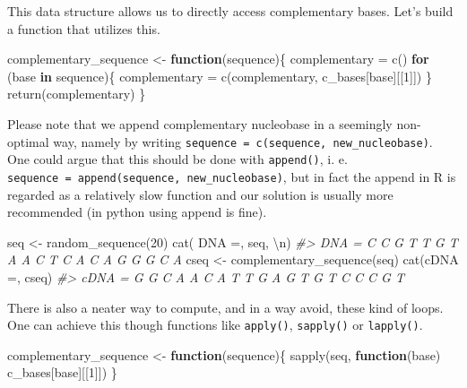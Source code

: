\documentclass[
]{book}
\newenvironment{Shaded}{\begin{snugshade}}{\end{snugshade}}
\newcommand{\CommentTok}[1]{\textcolor[rgb]{0.56,0.35,0.01}{\textit{#1}}}
\newcommand{\ControlFlowTok}[1]{\textcolor[rgb]{0.13,0.29,0.53}{\textbf{#1}}}
\newcommand{\DecValTok}[1]{\textcolor[rgb]{0.00,0.00,0.81}{#1}}
\newcommand{\FunctionTok}[1]{\textcolor[rgb]{0.00,0.00,0.00}{#1}}
\newcommand{\NormalTok}[1]{#1}
\newcommand{\OtherTok}[1]{\textcolor[rgb]{0.56,0.35,0.01}{#1}}
\newcommand{\SpecialCharTok}[1]{\textcolor[rgb]{0.00,0.00,0.00}{#1}}
\newcommand{\StringTok}[1]{\textcolor[rgb]{0.31,0.60,0.02}{#1}}
\begin{document}
This data structure allows us to directly access complementary bases. Let's build a function that utilizes this.

\begin{Shaded}
\begin{Highlighting}[]
\NormalTok{complementary\_sequence }\OtherTok{\textless{}{-}} \ControlFlowTok{function}\NormalTok{(sequence)\{}
\NormalTok{  complementary }\OtherTok{=} \FunctionTok{c}\NormalTok{()}
  \ControlFlowTok{for}\NormalTok{ (base }\ControlFlowTok{in}\NormalTok{ sequence)\{}
\NormalTok{    complementary }\OtherTok{=} \FunctionTok{c}\NormalTok{(complementary, c\_bases[base][[}\DecValTok{1}\NormalTok{]])}
\NormalTok{  \}}
  \FunctionTok{return}\NormalTok{(complementary)}
\NormalTok{\}}
\end{Highlighting}
\end{Shaded}

Please note that we append complementary nucleobase in a seemingly non-optimal way, namely by writing \texttt{sequence\ =\ c(sequence,\ new\_nucleobase)}. One could argue that this should be done with \texttt{append()}, i. e. \texttt{sequence\ =\ append(sequence,\ new\_nucleobase)}, but in fact the append in R is regarded as a relatively slow function and our solution is usually more recommended (in python using append is fine).

\begin{Shaded}
\begin{Highlighting}[]
\NormalTok{seq }\OtherTok{\textless{}{-}} \FunctionTok{random\_sequence}\NormalTok{(}\DecValTok{20}\NormalTok{)}
\FunctionTok{cat}\NormalTok{(}\StringTok{\textquotesingle{} DNA =\textquotesingle{}}\NormalTok{, seq, }\StringTok{\textquotesingle{}}\SpecialCharTok{\textbackslash{}n}\StringTok{\textquotesingle{}}\NormalTok{)}
\CommentTok{\#\textgreater{}  DNA = C C G T T G T A A C T C A C A G G G C A}
\NormalTok{cseq }\OtherTok{\textless{}{-}} \FunctionTok{complementary\_sequence}\NormalTok{(seq)}
\FunctionTok{cat}\NormalTok{(}\StringTok{\textquotesingle{}cDNA =\textquotesingle{}}\NormalTok{, cseq)}
\CommentTok{\#\textgreater{} cDNA = G G C A A C A T T G A G T G T C C C G T}
\end{Highlighting}
\end{Shaded}

There is also a neater way to compute, and in a way avoid, these kind of loops. One can achieve this though functions like \texttt{apply()}, \texttt{sapply()} or \texttt{lapply()}.

\begin{Shaded}
\begin{Highlighting}[]
\NormalTok{complementary\_sequence }\OtherTok{\textless{}{-}} \ControlFlowTok{function}\NormalTok{(sequence)\{}
  \FunctionTok{sapply}\NormalTok{(seq, }\ControlFlowTok{function}\NormalTok{(base) c\_bases[base][[}\DecValTok{1}\NormalTok{]])}
\NormalTok{\}}
\end{Highlighting}
\end{Shaded}
\end{document}
